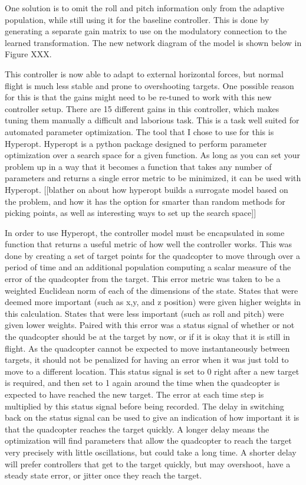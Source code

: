 \documentclass[letterpaper,12pt,titlepage,oneside,final]{book}
\begin{document}
One solution is to omit the roll and pitch information only from the adaptive population, while still using it for the baseline controller. 
This is done by generating a separate gain matrix to use on the modulatory connection to the learned transformation. 
The new network diagram of the model is shown below in Figure XXX.


This controller is now able to adapt to external horizontal forces, but normal flight is much less stable and prone to overshooting targets. 
One possible reason for this is that the gains might need to be re-tuned to work with this new controller setup. 
There are 15 different gains in this controller, which makes tuning them manually a difficult and laborious task.
This is a task well suited for automated parameter optimization. 
The tool that I chose to use for this is Hyperopt. 
Hyperopt is a python package designed to perform parameter optimization over a search space for a given function. 
As long as you can set your problem up in a way that it becomes a function that takes any number of parameters and returns a single error metric to be minimized, it can be used with Hyperopt. [[blather on about how hyperopt builds a surrogate model based on the problem, and how it has the option for smarter than random methods for picking points, as well as interesting ways to set up the search space]]

In order to use Hyperopt, the controller model must be encapsulated in some function that returns a useful metric of how well the controller works. This was done by creating a set of target points for the quadcopter to move through over a period of time and an additional population computing a scalar measure of the error of the quadcopter from the target. This error metric was taken to be a weighted Euclidean norm of each of the dimensions of the state. States that were deemed more important (such as x,y, and z position) were given higher weights in this calculation. States that were less important (such as roll and pitch) were given lower weights. 
Paired with this error was a status signal of whether or not the quadcopter should be at the target by now, or if it is okay that it is still in flight. 
As the quadcopter cannot be expected to move instantaneously between targets, it should not be penalized for having an error when it was just told to move to a different location. 
This status signal is set to 0 right after a new target is required, and then set to 1 again around the time when the quadcopter is expected to have reached the new target. The error at each time step is multiplied by this status signal before being recorded. 
The delay in switching back on the status signal can be used to give an indication of how important it is that the quadcopter reaches the target quickly. 
A longer delay means the optimization will find parameters that allow the quadcopter to reach the target very precisely with little oscillations, but could take a long time. 
A shorter delay will prefer controllers that get to the target quickly, but may overshoot, have a steady state error, or jitter once they reach the target.
\end{document}
